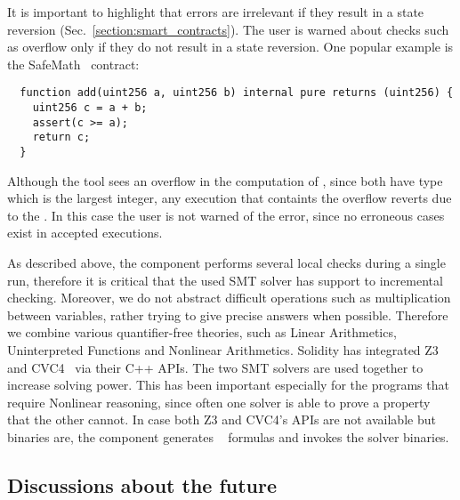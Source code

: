 It is important to highlight that errors are irrelevant if they result in a
state reversion (Sec.~\ref{section:smart_contracts}). The user is warned
about checks such as overflow only if they do not result in a state reversion.
%
One popular example is the SafeMath~\cite{SafeMath} contract:

\begin{verbatim}
  function add(uint256 a, uint256 b) internal pure returns (uint256) {
    uint256 c = a + b;
    assert(c >= a);
    return c;
  }
\end{verbatim}

Although the tool sees an overflow in the computation of , since
both have type  which is the largest integer, any execution that
containts the overflow reverts due to the .
%
In this case the user is not warned of the error, since no erroneous cases
exist in accepted executions.

As described above, the component performs several local checks during a single
run, therefore it is critical that the used SMT solver has support to
incremental checking.
%
Moreover, we do not abstract difficult operations such as multiplication
between variables, rather trying to give precise answers when possible.
%
Therefore we combine various quantifier-free theories, such as Linear
Arithmetics, Uninterpreted Functions and Nonlinear Arithmetics. 
%
Solidity has integrated Z3~\cite{Z3} and CVC4~\cite{CVC4} via their C++ APIs.
%
The two SMT solvers are used together to increase solving power.
%
This has been important especially for the programs that require Nonlinear
reasoning, since often one solver is able to prove a property that the other
cannot.
%
In case both Z3 and CVC4's APIs are not available but binaries are, the
component generates ~\cite{SMTLIB} formulas and invokes the
solver binaries.


\subsection{Discussions about the future}

\\
\\
